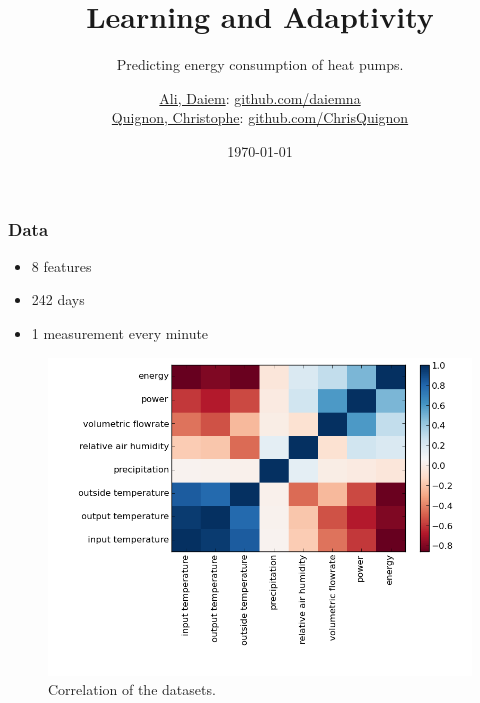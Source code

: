 \documentclass{beamer}
\begin{document}
\title{Learning and Adaptivity}
\subtitle{Predicting energy consumption of heat pumps.}
\author{
  \href{daiem.ali@smail.inf.h-brs.de}{Ali, Daiem}: \href{https://github.com/daiemna}{github.com/daiemna}\\
  \href{christophe.quignon@smail.inf.h-brs.de}{Quignon, Christophe}: \href{https://github.com/ChrisQuignon}{github.com/ChrisQuignon}
} 
\date{\today}

\begin{frame}
\titlepage{}
\end{frame}
	

\begin{frame}
\frametitle{Data}


\begin{itemize}
\item 8 features
\item 242 days
\item 1 measurement every minute
\end{itemize}

\begin{figure}[H]
  \center
  \includegraphics[width=0.6\linewidth]{img/correlation.png}
  \caption{Correlation of the datasets.}
  \label{fig:correlation}
\end{figure}


\end{frame}
\end{document}
